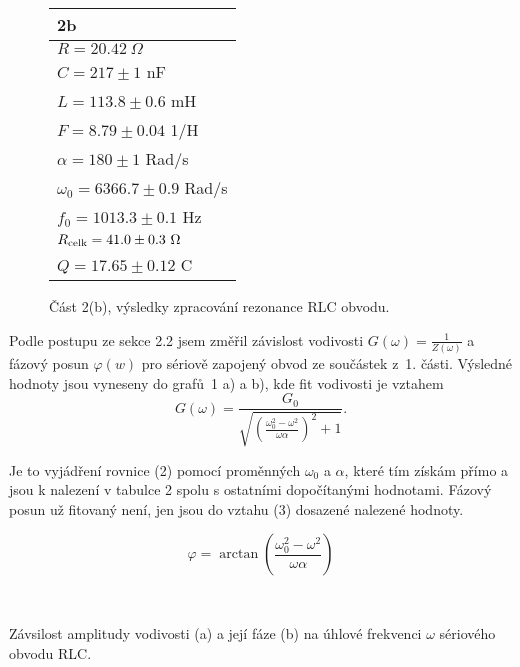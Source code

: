 \documentclass[a4paper,11pt]{article}
\begin{document}
\begin{wrapfigure}[15]{tr}{0.35\textwidth}
    \vspace{-23pt}
    \begin{tabular}{l}
        \hline \hline
        2b \\
        \hline
        $R = 20.42\ \Omega$\\
        $C = 217 \pm 1 $ nF \\
        $L = 113.8 \pm 0.6 $ mH \\
        $F = 8.79 \pm  0.04$  1/H\\
        $\alpha = 180  \pm  1$ Rad/s\\
        $\omega_0 = 6366.7  \pm  0.9$ Rad/s \\
        $f_0 = 1013.3 \pm 0.1$ Hz \\
        $R_{\rm celk} = 41.0 \pm 0.3\ \Omega$ \\
        $Q = 17.65 \pm 0.12$ C \\
        \hline \hline
    \end{tabular}
    \caption{Část 2(b),  výsledky zpracování rezonance RLC obvodu.}
\end{wrapfigure}

Podle postupu ze sekce 2.2 jsem změřil závislost vodivosti $ G(\omega) = \frac{1}{Z(\omega)} $ a fázový posun $ \varphi(w) $ pro sériově zapojený obvod ze součástek z~1. části. Výsledné hodnoty jsou vyneseny do grafů~1 a) a b), kde fit vodivosti je vztahem
\begin{equation*}
G(\omega) = \frac{G_0}{\sqrt{ (\frac{\omega_0^2 - \omega^2}{\omega \alpha})^{2} + 1 } }.
\end{equation*}

\noindent
Je to vyjádření rovnice (2) pomocí proměnných $ \omega_0 $ a $ \alpha $, které tím získám přímo a jsou k nalezení v tabulce 2 spolu s ostatními dopočítanými hodnotami. Fázový posun už fitovaný není, jen jsou do vztahu (3) dosazené nalezené hodnoty.

\begin{equation*}
\varphi = \arctan\left(\frac{\omega_0^2 - \omega^2}{\omega \alpha}\right)
\end{equation*}

\begin{table}[htpb]
    \begin{minipage}[b]{.45\linewidth}
        \centering
        \resizebox{\textwidth}{!}{  }
    \end{minipage} 
    \hfill
    \begin{minipage}[b]{.45\linewidth}
        \centering
        \resizebox{\textwidth}{!}{  } \\
    \end{minipage} 
    \vspace{10pt}
    \captionsetup{type=graph}
    \caption{Závsilost amplitudy vodivosti (a) a její fáze (b) na úhlové frekvenci $ \omega $ sériového obvodu RLC.}
\end{table}
\end{document}
